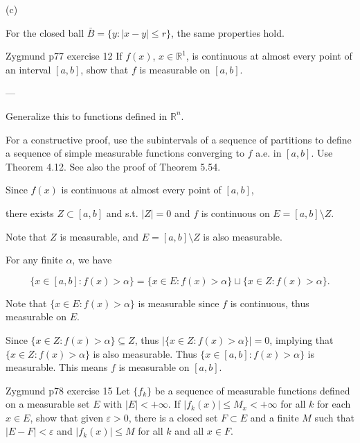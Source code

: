 \documentclass[UTF8,a4paper,10pt]{article}
\begin{document}
(c)

For the closed ball $\bar{B}  = \{y : |x - y| \leq r\}$, the same properties hold.

\pagebreak

\begin{Problem}[]{Zygmund p77 exercise 12}
  If $f(x)$, $x \in \mathbb{R}^1$, is continuous at almost every point of an interval $[a, b]$, show that $f$ is measurable on $[a, b]$. 
  
  ---

  Generalize this to functions defined in $\mathbb{R}^n$. 
  
  For a constructive proof, use the subintervals of a sequence of partitions to define a sequence of simple measurable functions converging to $f$ a.e. in $[a, b]$. Use Theorem 4.12. See also the proof of Theorem 5.54.

    \end{Problem}

    Since $f(x)$ is continuous at almost every point of $[a, b]$,
    
    there exists \(Z\subset [a,b]\) and s.t. $|Z| = 0$ and \(f\) is continuous on \(E = [a,b]\setminus Z\).


Note that $Z$ is measurable, and
$E = [a, b] \setminus Z$ is also measurable.


For any finite $\alpha$, we have

\[\{x \in [a, b] : f(x) > \alpha\} = \{x \in E  : f(x) > \alpha\} \sqcup \{x \in Z  : f(x) > \alpha\}.\]    


Note that $\{x \in E : f(x) > \alpha\}$ is measurable since $f$ is continuous, thus
measurable on $E$.


Since $\{x \in Z : f(x) > \alpha\} \subseteq Z$, thus $|\{x \in Z : f(x) > \alpha\}| = 0$, implying that
$\{x \in Z : f(x) > \alpha\}$ is also measurable.
Thus $\{x \in [a, b] : f(x) > \alpha\}$ is measurable. This means $f$ is measurable
on $[a, b]$.

  
\pagebreak

  \begin{Problem}[]{Zygmund p78 exercise 15}
Let $\{f_k\}$ be a sequence of measurable functions defined on a measurable set $E$ with $|E| < +\infty$. If $|f_k(x)| \leq M_x < +\infty$ for all $k$ for each $x \in E$, show that given $\varepsilon > 0$, there is a closed set $F \subset E$ and a finite $M$ such that $|E - F| < \varepsilon$ and $|f_k(x)| \leq M$ for all $k$ and all $x \in F$.

  \end{Problem}
\end{document}
